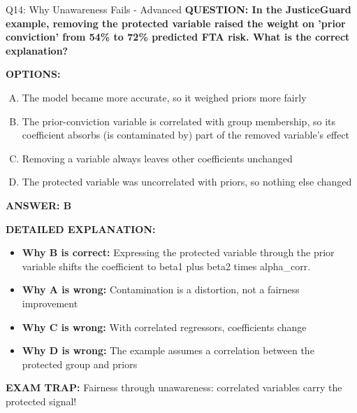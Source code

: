 \documentclass[8pt]{beamer}
\begin{document}
\begin{frame}[shrink=6]{Q14: Why Unawareness Fails - Advanced}
\fontsize{6.5}{7.5}\selectfont
\textbf{QUESTION: In the JusticeGuard example, removing the protected variable raised the weight on 'prior conviction' from 54\% to 72\% predicted FTA risk. What is the correct explanation?}

\vspace{0.1cm}
\textbf{OPTIONS:}
\begin{enumerate}[A.]
\item The model became more accurate, so it weighed priors more fairly
\item The prior-conviction variable is correlated with group membership, so its coefficient absorbs (is contaminated by) part of the removed variable's effect
\item Removing a variable always leaves other coefficients unchanged
\item The protected variable was uncorrelated with priors, so nothing else changed
\end{enumerate}

\vspace{0.1cm}
\textcolor{myblue}{\textbf{ANSWER: B}}

\vspace{0.1cm}
\textbf{DETAILED EXPLANATION:}
\begin{itemize}
\item \textbf{Why B is correct:} Expressing the protected variable through the prior variable shifts the coefficient to beta1 plus beta2 times alpha\_corr.
\item \textbf{Why A is wrong:} Contamination is a distortion, not a fairness improvement
\item \textbf{Why C is wrong:} With correlated regressors, coefficients change
\item \textbf{Why D is wrong:} The example assumes a correlation between the protected group and priors
\end{itemize}

\textcolor{myred}{\textbf{EXAM TRAP:}} Fairness through unawareness: correlated variables carry the protected signal!
\end{frame}
\end{document}
